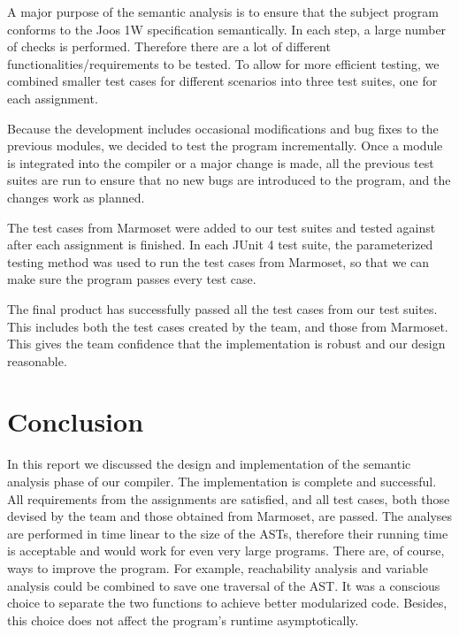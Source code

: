 \documentclass[a4paper, notitlepage]{report}
\begin{document}
A major purpose of the semantic analysis is to ensure that the subject program conforms to the Joos 1W specification semantically. In each step, a large number of checks is performed. Therefore there are a lot of different functionalities/requirements to be tested. To allow for more efficient testing, we combined smaller test cases for different scenarios into three test suites, one for each assignment.

Because the development includes occasional modifications and bug fixes to the previous modules, we decided to test the program incrementally. Once a module is integrated into the compiler or a major change is made, all the previous test suites are run to ensure that no new bugs are introduced to the program, and the changes work as planned.

The test cases from Marmoset were added to our test suites and tested against after each assignment is finished. In each JUnit 4 test suite, the parameterized testing method was used to run the test cases from Marmoset, so that we can make sure the program passes every test case. 

The final product has successfully passed all the test cases from our test suites. This includes both the test cases created by the team, and those from Marmoset. This gives the team confidence that the implementation is robust and our design reasonable.

\chapter{Conclusion}
In this report we discussed the design and implementation of the semantic analysis phase of our compiler. The implementation is complete and successful. All requirements from the assignments are satisfied, and all test cases, both those devised by the team and those obtained from Marmoset, are passed. The analyses are performed in time linear to the size of the ASTs, therefore their running time is acceptable and would work for even very large programs. There are, of course, ways to improve the program. For example, reachability analysis and variable analysis could be combined to save one traversal of the AST. It was a conscious choice to separate the two functions to achieve better modularized code. Besides, this choice does not affect the program's runtime asymptotically.




\end{document}
